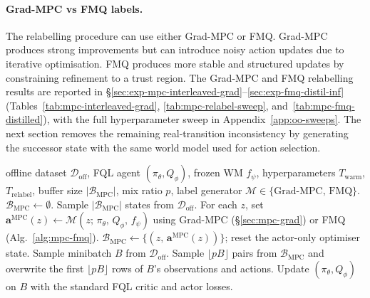 \paragraph{Grad-MPC vs FMQ labels.}
The relabelling procedure can use either Grad-MPC or FMQ. Grad-MPC
produces strong improvements but can introduce noisy action updates due
to iterative optimisation. FMQ produces more stable and structured
updates by constraining refinement to a trust region.
The Grad-MPC and FMQ relabelling results are reported in
\S\ref{sec:exp-mpc-interleaved-grad}--\ref{sec:exp-fmq-distil-inf}
(Tables~\ref{tab:mpc-interleaved-grad}, \ref{tab:mpc-relabel-sweep},
and~\ref{tab:mpc-fmq-distilled}), with the full hyperparameter sweep in
Appendix~\ref{app:oo-sweeps}. The next section removes the remaining
real-transition inconsistency by generating the successor state with the
same world model used for action selection.

\begin{algorithm}[h]
\caption{Interleaved training with MPC-generated actions.}
\label{alg:mpc-interleaved}
\begin{algorithmic}[1]
\Require offline dataset $\mathcal{D}_{\text{off}}$, FQL agent $(\pi_\theta, Q_\phi)$, frozen WM $f_\psi$, hyperparameters $T_{\text{warm}}$, $T_{\text{relabel}}$, buffer size $|\mathcal{B}_{\text{MPC}}|$, mix ratio $p$, label generator $\mathcal{M} \in \{\text{Grad-MPC},\, \text{FMQ}\}$.
\State $\mathcal{B}_{\text{MPC}} \leftarrow \emptyset$.
        \State Sample $|\mathcal{B}_{\text{MPC}}|$ states from $\mathcal{D}_{\text{off}}$.
        \State For each $z$, set $\mathbf{a}^{\text{MPC}}(z) \leftarrow \mathcal{M}(z;\,\pi_\theta,\,Q_\phi,\,f_\psi)$ using Grad-MPC (\S\ref{sec:mpc-grad}) or FMQ (Alg.~\ref{alg:mpc-fmq}).
        \State $\mathcal{B}_{\text{MPC}} \leftarrow \{(z,\,\mathbf{a}^{\text{MPC}}(z))\}$; reset the actor-only optimiser state.
    \EndIf
    \State Sample minibatch $B$ from $\mathcal{D}_{\text{off}}$.
        \State Sample $\lfloor pB \rfloor$ pairs from $\mathcal{B}_{\text{MPC}}$ and overwrite the first $\lfloor pB \rfloor$ rows of $B$'s observations and actions.
    \EndIf
    \State Update $(\pi_\theta, Q_\phi)$ on $B$ with the standard FQL critic and actor losses.
\EndFor
\end{algorithmic}
\end{algorithm}


